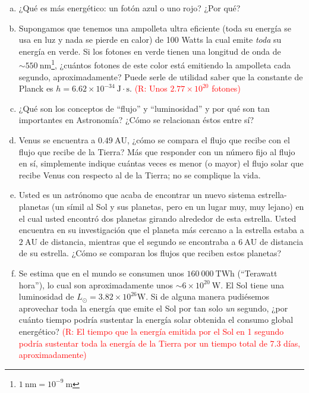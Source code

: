 \documentclass{article}
\begin{document}
\begin{enumerate} [a)]

\item ¿Qué es más energético: un fotón azul o uno rojo? ¿Por qué?

\item Supongamos que tenemos una ampolleta ultra eficiente (toda su energía se usa en luz y nada se pierde en calor) de 100 Watts la cual emite \emph{toda} su energía en verde. Si los fotones en verde tienen una longitud de onda de $\sim 550 \ \text{nm}$\footnote{$1 \ \text{nm} = 10^{-9} \ \text{m}$}, ¿cuántos fotones de este color está emitiendo la ampolleta cada segundo, aproximadamente? Puede serle de utilidad saber que la constante de Planck es $h = 6.62 \times 10^{-34} \ \text{J} \cdot \text{s}$. 
\textcolor{red}{(R: Unos $2.77 \times 10^{20}$ fotones)}

\item ¿Qué son los conceptos de ``flujo'' y ``luminosidad'' y por qué son tan importantes en Astronomía? ¿Cómo se relacionan éstos entre sí?

\item Venus se encuentra a $0.49 \ \text{AU}$, ¿cómo se compara el flujo que recibe con el flujo que recibe de la Tierra? Más que responder con un número fijo al flujo en sí, simplemente indique cuántas veces es menor (o mayor) el flujo solar que recibe Venus con respecto al de la Tierra; no se complique la vida.

\newpage

\item Usted es un astrónomo que acaba de encontrar un nuevo sistema estrella-planetas (un símil al Sol y sus planetas, pero en un lugar muy, muy lejano) en el cual usted encontró dos planetas girando alrededor de esta estrella. Usted encuentra en su investigación que el planeta más cercano a la estrella estaba a $2 \ \text{AU}$ de distancia, mientras que el segundo se encontraba a $6 \ \text{AU}$ de distancia de su estrella. ¿Cómo se comparan los flujos que reciben estos planetas?

\item Se estima que en el mundo se consumen unos $160 \ 000 \ \text{TWh}$ (``Terawatt hora''), lo cual son aproximadamente unos $\sim 6 \times 10^{20} \ \text{W}$. El Sol tiene una luminosidad de $L_\odot = 3.82 \times 10^{26} \text{W}$. Si de alguna manera pudiésemos aprovechar toda la energía que emite el Sol por tan solo \emph{un} segundo, ¿por cuánto tiempo podría sustentar la energía solar obtenida el consumo global energético? \textcolor{red}{(R: El tiempo que la energía emitida por el Sol en 1 segundo podría sustentar toda la energía de la Tierra por un tiempo total de 7.3 días, aproximadamente)}
\end{enumerate}
\end{document}
